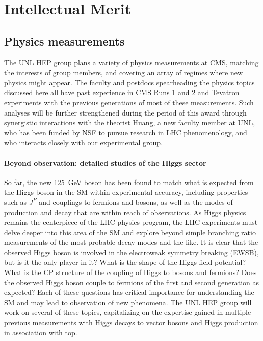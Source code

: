 \section{Intellectual Merit}
\label{sec:future}

\subsection{Physics measurements}

The UNL HEP group plans a variety of physics measurements at CMS, matching the interests of group members, and covering an array of regimes where new physics might appear. The faculty and postdocs spearheading the physics topics discussed here all have past experience in CMS Runs 1 and 2 and Tevatron experiments with the previous generations of most of these measurements. Such analyses will be further strengthened during the period of this award through synergistic interactions with the theorist Huang, a new faculty member at UNL, who has been funded by NSF to pursue research in LHC phenomenology, and who interacts closely with our experimental group.

\paragraph{Beyond observation: detailed studies of the Higgs sector} 
So far, the  new 125~GeV boson has been found to match what is expected from the Higgs boson in the SM within experimental accuracy, including properties such as $J^P$ and couplings to fermions and bosons, as well as the modes of production and decay that are within reach of observations. As Higgs physics remains the centerpiece of the LHC physics program, the LHC experiments must delve deeper into this area of the SM and explore beyond simple branching ratio measurements of the most probable decay modes and  the like. It is clear that the observed Higgs boson is involved in the electroweak symmetry breaking (EWSB), but is it the only player in it? What is the shape of the Higgs field potential? What is the CP structure of the coupling of Higgs to bosons and fermions? Does the observed Higgs boson couple to fermions of the first and second generation as expected? Each of these questions has critical importance for understanding the SM and may lead to observation of new phenomena. The UNL HEP group will work on several of these  topics, capitalizing on the expertise gained in multiple previous measurements with Higgs decays to vector bosons and Higgs production in association with top.


